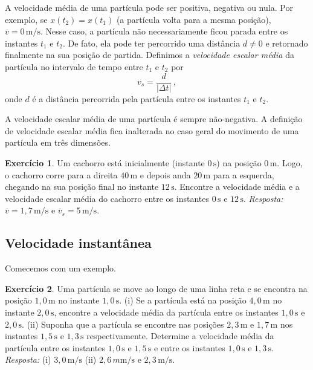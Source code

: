 \documentclass[12pt,a4paper]{article}
\theoremstyle{definition}
\newtheorem{ex}{Exercício}[section]
\begin{document}
A velocidade média de uma partícula pode ser positiva, negativa ou
nula. Por exemplo, se $x(t_2)=x(t_1)$ (a partícula volta para a mesma
posição), $\overline{v}=0\,\mathrm{m/s}$. Nesse caso, a partícula não
necessariamente ficou parada entre os instantes $t_1$ e $t_2$. De
fato, ela pode ter percorrido uma distância $d\ne 0$ e retornado
finalmente na sua posição de partida. Definimos a \emph{velocidade
  escalar média} da partícula no intervalo de tempo entre $t_1$ e
$t_2$ por
$$v_s=\frac{d}{|\Delta t|}\,,$$
onde $d$ é a distância percorrida pela partícula entre os instantes
$t_1$ e $t_2$.

A velocidade escalar média de uma partícula é sempre não-negativa. A
definição de velocidade escalar média fica inalterada no caso geral do
movimento de uma partícula em três dimensões.

\begin{ex}
  Um cachorro está inicialmente (instante $0\,\mathrm{s}$) na posição
  $0\,\mathrm{m}$. Logo, o cachorro corre para a direita
  $40\,\mathrm{m}$ e depois anda $20\,\mathrm{m}$ para a esquerda,
  chegando na sua posição final no instante $12\,\mathrm{s}$. Encontre
  a velocidade média e a velocidade escalar média do cachorro entre os
  instantes $0\,\mathrm{s}$ e $12\,\mathrm{s}$. \emph{Resposta:}
  $\overline{v}=1{,}7\,\mathrm{m/s}$ e
  $\overline{v}_s=5\,\mathrm{m/s}$.
\end{ex}

\subsection{Velocidade instantânea}

Comecemos com um exemplo.

\begin{ex}
  Uma partícula se move ao longo de uma linha reta e se encontra na
  posição $1{,}0\,\mathrm{m}$ no instante $1{,}0\,\mathrm{s}$. (i) Se
  a partícula está na posição $4{,}0\,\mathrm{m}$ no instante
  $2{,}0\,\mathrm{s}$, encontre a velocidade média da partícula entre
  os instantes $1{,}0\,\mathrm{s}$ e $2{,}0\,\mathrm{s}$. (ii) Suponha
  que a partícula se encontre nas posições $2{,}3\,\mathrm{m}$ e
  $1{,}7\,\mathrm{m}$ nos instantes $1{,}5\,\mathrm{s}$ e
  $1{,}3\,\mathrm{s}$ respectivamente. Determine a velocidade média da
  partícula entre os instantes $1{,}0\,\mathrm{s}$ e
  $1{,}5\,\mathrm{s}$ e entre os instantes $1{,}0\,\mathrm{s}$ e
  $1{,}3\,\mathrm{s}$. \emph{Resposta:} (i) $3{,}0\,\mathrm{m/s}$ (ii)
  $2{,}6\,m\mathrm{m/s}$ e $2{,}3\,\mathrm{m/s}$.
\end{ex}
\end{document}
